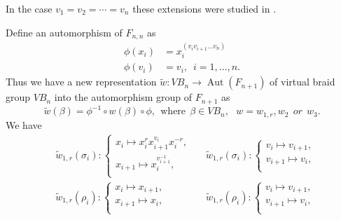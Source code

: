 \documentclass[11 pt, reqno]{amsart}
\theoremstyle{definition}
\numberwithin{equation}{subsection}
\newcommand{\Aut}{\operatorname{Aut}}
\begin{document}
In the case $v_1 = v_2 = \cdots = v_n$ these extensions were studied in \cite{Mih}.





Define an automorphism of $F_{n,n}$ as
\begin{align*}
\phi(x_i)&=x_i ^{(v_i v_{i+1} \ldots v_n)}\\
\phi(v_i)&=v_i,\,\,\, i=1,\ldots,n.
\end{align*}
Thus we have a new representation $\tilde{w}: VB_n \to \Aut(F_{n+1})$ of virtual braid group $VB_n$ into the automorphism group of $F_{n+1}$ as
$$
\tilde{w}(\beta)=\phi^{-1} \circ w(\beta) \circ \phi, ~~\textrm{where}~~ \beta \in VB_n, ~~~ w=w_{1,r}, w_2~~or~~ w_3.
$$
We have
\begin{align*}
&\tilde{w}_{1,r}(\sigma_i) :
\left\{
\begin{array}{l}
  x_i \mapsto  x_i^r x_{i+1}^{v_i} x_i^{-r}, \\
  x_{i+1} \mapsto x_i^{v_{i+1}^{-1}},  \\
\end{array}
\right.~~~
&\tilde{w}_{1,r}(\sigma_i) :
\left\{
\begin{array}{l}
  v_i \mapsto  v_{i+1}, \\
  v_{i+1} \mapsto v_i,  \\
\end{array}
\right.\\
&\tilde{w}_{1,r}(\rho_i) :
\left\{
\begin{array}{l}
  x_i \mapsto  x_{i+1}, \\
  x_{i+1} \mapsto x_i,  \\
\end{array}
\right.~~~
&\tilde{w}_{1,r}(\rho_i) :
\left\{
\begin{array}{l}
  v_i \mapsto  v_{i+1}, \\
  v_{i+1} \mapsto v_i , \\
\end{array}
\right.
\end{align*}
\end{document}
